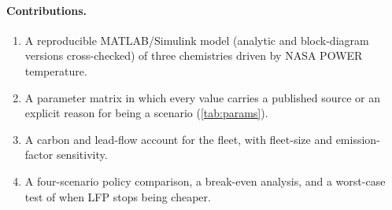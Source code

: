 \paragraph{Contributions.}
\begin{enumerate}[nosep,leftmargin=*]
\item A reproducible MATLAB/Simulink model (analytic and block-diagram versions cross-checked) of three chemistries driven by NASA POWER temperature.
\item A parameter matrix in which every value carries a published source or an explicit reason for being a scenario (\cref{tab:params}).
\item A carbon and lead-flow account for the fleet, with fleet-size and emission-factor sensitivity.
\item A four-scenario policy comparison, a break-even analysis, and a worst-case test of when LFP stops being cheaper.
\end{enumerate}
